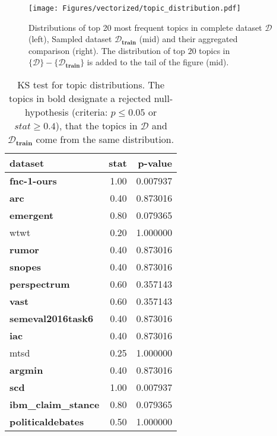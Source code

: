 \documentclass[11pt]{article}
\begin{document}
\begin{figure*}
\centering
\texttt{[image: Figures/vectorized/topic\_distribution.pdf]}
\caption{Distributions of top 20 most frequent topics in complete dataset $\mathcal{D}$ (left), Sampled dataset $\mathcal{D}_\textbf{train}$ (mid) and their aggregated comparison (right). The distribution of top $20$ topics in $\{\mathcal{D}\} - \{\mathcal{D}_\textbf{train}\}$ is added to the tail of the figure (mid). 
}
\label{fig:imbalanced}
\end{figure*}



\begin{table}
\centering
\fontsize{10}{10}\selectfont
\begin{tabular}{@{}lrr@{}}
\toprule
 dataset                    & stat  & p-value  \\ \midrule
\textbf{fnc-1-ours}         & 1.00 & 0.007937 \\
\textbf{arc}                & 0.40 & 0.873016 \\
\textbf{emergent}           & 0.80 & 0.079365 \\
wtwt                        & 0.20 & 1.000000 \\
\textbf{rumor}              & 0.40 & 0.873016 \\
\textbf{snopes}             & 0.40 & 0.873016 \\
\textbf{perspectrum}        & 0.60 & 0.357143 \\
\textbf{vast}               & 0.60 & 0.357143 \\
\textbf{semeval2016task6}   & 0.40 & 0.873016 \\
\textbf{iac}                & 0.40 & 0.873016 \\
mtsd                        & 0.25 & 1.000000 \\
\textbf{argmin}             & 0.40 & 0.873016 \\
\textbf{scd}                & 1.00 & 0.007937 \\
\textbf{ibm\_claim\_stance} & 0.80 & 0.079365 \\
\textbf{politicaldebates}   & 0.50 & 1.000000 \\ \bottomrule
\end{tabular}\caption{KS test for topic distributions. The topics in bold designate a rejected null-hypothesis (criteria: $p\leq0.05$ or $\textit{stat} \geq 0.4$), that the topics in $\mathcal{D}$ and $\mathcal{D}_\textbf{train}$ come from the same distribution.}
\label{tab:kalmagorov}
\end{table}
\end{document}
